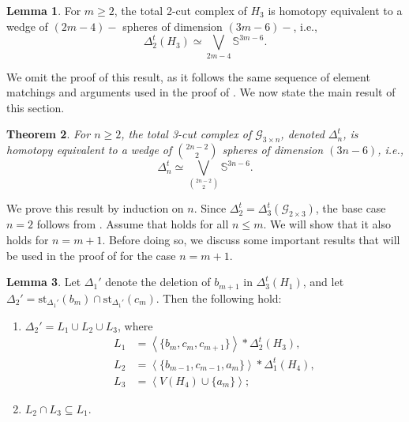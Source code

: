 \documentclass[11pt,reqno,a4paper]{amsart}
\newtheorem{theorem}{Theorem}[section]
\theoremstyle{definition}
\theoremstyle{theorem}
\newtheorem{lemma}[theorem]{Lemma}
\newcommand{\totalthreecut}{\Delta_{3}^t}
\newcommand{\threegg}{\mathcal{G}_{3\times n}}
\newcommand{\lno}{\left(}
\newcommand{\rno}{\right)}
\newcommand{\bbS}{\mathbb{S}}
\newcommand{\st}{\mathrm{st}}
\theoremstyle{remark}
\begin{document}
     
\begin{lemma}\label{thm: homotopy type of total 2-cut complex of H1}
    For $m \geq 2$, the total 2-cut complex of $H_3$ is homotopy equivalent to a wedge of $\lno 2m-4 \rno-$ spheres of dimension $\lno 3m-6 \rno-$, i.e., $$\Delta_2^t \lno H_3 \rno \simeq \bigvee\limits_{2m-4}\bbS^{3m-6}.$$
\end{lemma}

We omit the proof of this result, as it follows the same sequence of element matchings and arguments used in the proof of . 
We now state the main result of this section.

  
\begin{theorem}\label{thm: homotopy of 3-cut complex of (3×n)-gg}
    For $n \geq 2$, the total 3-cut complex of $\threegg$, denoted $\Delta_n^t$, is homotopy equivalent to a wedge of $\binom{2n-2}{2}$ spheres of dimension $\lno 3n-6 \rno$, i.e., $$\Delta_n^t \simeq \bigvee\limits_{\binom{2n-2}{2}}\bbS^{3n-6}.$$
\end{theorem}
  

We prove this result by induction on $n$. 
Since $\Delta_2^t = \totalthreecut\lno \mathcal{G}_{2\times 3}\rno$, the base case $n=2$ follows from . 
Assume that  holds for all $n \le m$. 
We will show that it also holds for $n = m+1$. 
Before doing so, we discuss some important results that will be used in the proof of  for the case $n = m+1$.

\begin{lemma}\label{claim: homotopy of total 3-cut of 3×m mthreeggp}
Let $\Delta_1'$ denote the deletion of $b_{m+1}$ in $\totalthreecut \lno H_1 \rno$, and let $\Delta_2' 
    = \st_{\Delta_1'}\lno b_m \rno \cap \st_{\Delta_1'}\lno c_m \rno.$
Then the following hold:
\begin{enumerate}
    \item $\Delta_2' = L_1 \cup L_2 \cup L_3$, where
    \begin{align*}
        L_1 &= \left\langle \{b_m, c_m, c_{m+1}\} \right\rangle 
              * \Delta_2^t \lno H_3 \rno,\\
        L_2 &= \left\langle \{b_{m-1}, c_{m-1}, a_m\} \right\rangle 
              * \Delta_1^t \lno H_4 \rno,\\
        L_3 &= \left\langle V\lno H_4 \rno \cup \{a_m\} \right\rangle;
    \end{align*}

    \item $L_2 \cap L_3 \subseteq L_1$.
\end{enumerate}
\end{lemma}
\end{document}

